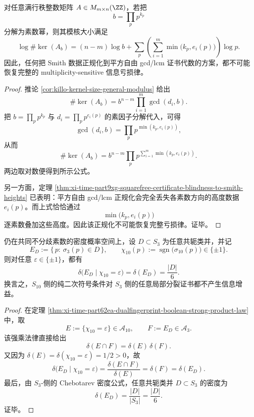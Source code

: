 \begin{corollary}\label{cor:xi-time-part9xg-squarefree-normalization-cannot-close-loss-law}
对任意满行秩整数矩阵 \(A\in M_{m\times n}(\ZZ)\)，若把
\[
b=\prod_p p^{k_p}
\]
分解为素数幂，则其模核大小满足
\[
\log \#\ker(A_b)
=
(n-m)\log b
+\sum_p\left(\sum_{i=1}^{m}\min\bigl(k_p,e_i(p)\bigr)\right)\log p.
\]
因此，任何把 Smith 数据正规化到平方自由 gcd/lcm 证书代数的方案，都不可能恢复完整的 multiplicity-sensitive 信息亏损律。
\end{corollary}
\begin{proof}
推论 \ref{cor:killo-kernel-size-general-modulus} 给出
\[
\#\ker(A_b)=b^{n-m}\prod_{i=1}^{m}\gcd(d_i,b).
\]
把 \(b=\prod_p p^{k_p}\) 与 \(d_i=\prod_p p^{e_i(p)}\) 的素因子分解代入，可得
\[
\gcd(d_i,b)=\prod_p p^{\min(k_p,e_i(p))},
\]
从而
\[
\#\ker(A_b)
=
b^{n-m}\prod_p p^{\sum_{i=1}^{m}\min(k_p,e_i(p))}.
\]
两边取对数便得到所示公式。

另一方面，定理 \ref{thm:xi-time-part9xg-squarefree-certificate-blindness-to-smith-heights} 已表明：平方自由 gcd/lcm 正规化会完全丢失各素数方向的高度数据 \(e_i(p)\)。而上式恰恰通过
\[
\min\bigl(k_p,e_i(p)\bigr)
\]
逐素数叠加这些高度。因此该正规化不可能恢复完整亏损律。证毕。
\end{proof}

\begin{theorem}\label{thm:xi-time-part9xg-s10-parity-neutrality-for-s3-splitting}
仍在共同不分歧素数的密度概率空间上，设 \(D\subset S_3\) 为任意共轭类并，并记
\[
E_D:=\{\,p:\ \sigma_3(p)\in D\,\},
\qquad
\chi_{10}(p):=\operatorname{sgn}\!\bigl(\sigma_{10}(p)\bigr)\in\{\pm1\}.
\]
则对任意 \(\varepsilon\in\{\pm1\}\)，都有
\[
\delta\!\bigl(E_D\mid \chi_{10}=\varepsilon\bigr)=\delta(E_D)=\frac{|D|}{6}.
\]
换言之，\(S_{10}\) 侧的纯二次符号条件对 \(S_3\) 侧的任意局部分裂证书都不产生信息增益。
\end{theorem}
\begin{proof}
在定理 \ref{thm:xi-time-part62ea-dualfingerprint-boolean-strong-product-law} 中，取
\[
E:=\{\chi_{10}=\varepsilon\}\in \mathcal A_{10},
\qquad
F:=E_D\in \mathcal A_3.
\]
该强乘法律直接给出
\[
\delta(E\cap F)=\delta(E)\,\delta(F).
\]
又因为 \(\delta(E)=\delta(\chi_{10}=\varepsilon)=1/2>0\)，故
\[
\delta\!\bigl(E_D\mid \chi_{10}=\varepsilon\bigr)
=
\frac{\delta(E\cap F)}{\delta(E)}
=
\delta(F)
=
\delta(E_D).
\]
最后，由 \(S_3\)-侧的 Chebotarev 密度公式，任意共轭类并 \(D\subset S_3\) 的密度为
\[
\delta(E_D)=\frac{|D|}{|S_3|}=\frac{|D|}{6}.
\]
证毕。
\end{proof}

